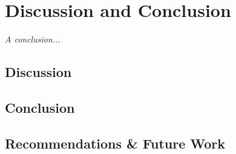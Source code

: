 \chapter{Discussion and Conclusion}
\label{chapter:conclusion}

\emph{A conclusion...}

\section{Discussion}

\section{Conclusion}

\section{Recommendations \& Future Work}

